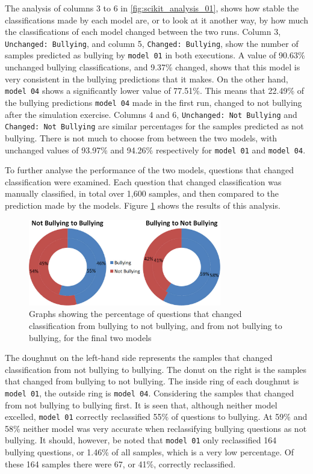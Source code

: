 The analysis of columns 3 to 6 in \ref{fig:scikit_analysis_01}, shows how stable the classifications made by each model are, or to look at it another way, by how much the classifications of each model changed between the two runs. Column 3, \verb|Unchanged: Bullying|, and column 5, \verb|Changed: Bullying|, show the number of samples predicted as bullying by \verb|model 01| in both executions. A value of 90.63\% unchanged bullying classifications, and 9.37\% changed, shows that this model is very consistent in the bullying predictions that it makes. On the other hand, \verb|model 04| shows a significantly lower value of 77.51\%. This means that 22.49\% of the bullying predictions \verb|model 04| made in the first run, changed to not bullying after the simulation exercise. Columns 4 and 6, \verb|Unchanged: Not Bullying| and \verb|Changed: Not Bullying| are similar percentages for the samples predicted as not bullying. There is not much to choose from between the two models, with unchanged values of 93.97\% and 94.26\% respectively for \verb|model 01| and \verb|model 04|.

To further analyse the performance of the two models, questions that changed classification were examined. Each question that changed classification was manually classified, in total over 1,600 samples, and then compared to the prediction made by the models. Figure \ref{fig:second_classification} shows the results of this analysis.

\begin{figure}[htbp]
	\centering
	\includegraphics[width=0.75\textwidth]{Figures/Chapter5/second_classification.jpg}
	\caption[Analysis of samples that changed classification]{Graphs showing the percentage of questions that changed classification from bullying to not bullying, and from not bullying to bullying, for the final two models}
	\label{fig:second_classification}
\end{figure}

The doughnut on the left-hand side represents the samples that changed classification from not bullying to bullying. The donut on the right is the samples that changed from bullying to not bullying. The inside ring of each doughnut is \verb|model 01|, the outside ring is \verb|model 04|. Considering the samples that changed from not bullying to bullying first. It is seen that, although neither model excelled, \verb|model 01| correctly reclassified 55\% of questions to bullying. At 59\% and 58\% neither model was very accurate when reclassifying bullying questions as not bullying. It should, however, be noted that \verb|model 01| only reclassified 164 bullying questions, or 1.46\% of all samples, which is a very low percentage. Of these 164 samples there were 67, or 41\%, correctly reclassified.

